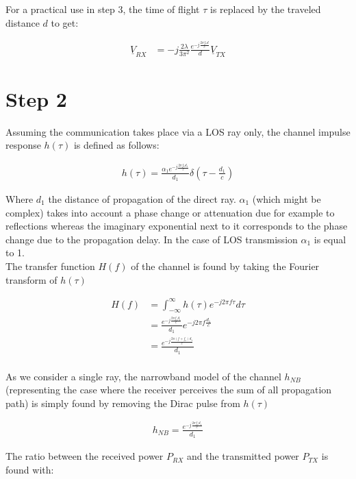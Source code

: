 \documentclass[10pt,a4paper]{ULBreport}
\begin{document}
For a practical use in step 3, the time of flight $\tau$ is replaced by the traveled distance $d$ to get:

\begin{align}
    \underline{V}_{RX} &= -j\frac{2 \lambda }{3\pi^2}\frac{e^{-j\frac{2\pi f_c d}{c}}}{d}\underline{V}_{TX}
    \label{eq:voltage_RX}
\end{align}

\section{Step 2}

Assuming the communication takes place via a LOS ray only, the channel impulse response $h(\tau)$ is defined as follows:

\begin{align*}
    h(\tau) = \frac{\alpha_1 e^{-j\frac{2\pi f_cd_1}{c}}}{d_1} \delta(\tau - \frac{d_1}{c})
\end{align*}

Where $d_1$ the distance of propagation of the direct ray. $\alpha_1$ (which might be complex) takes into account a phase change or attenuation due for example to reflections whereas the imaginary exponential next to it corresponds to the phase change due to the propagation delay. In the case of LOS transmission $\alpha_1$ is equal to 1.\\
The transfer function $H(f)$ of the channel is found by taking the Fourier transform of $h(\tau)$

\begin{align*}
    H(f) &= \int_{-\infty}^{\infty} h(\tau) e^{-j2\pi f \tau} d\tau\\
    &= \frac{e^{-j\frac{2\pi f_c d_1}{c}}}{d_1}e^{-j2\pi f \frac{d_1}{c}}\\
    &= \frac{e^{-j \frac{2\pi (f+f_c)d_1}{c}}}{d_1}\\
\end{align*}

As we consider a single ray, the narrowband model of the channel $h_{NB}$ (representing the case where the receiver perceives the sum of all propagation path) is simply found by removing the Dirac pulse from $h(\tau)$

\begin{align*}
    h_{NB} = \frac{e^{-j \frac{2\pi f_cd_1}{c}}}{d_1}
\end{align*}

The ratio between the received power $P_{RX}$ and the transmitted power $P_{TX}$ is found with:
\end{document}
